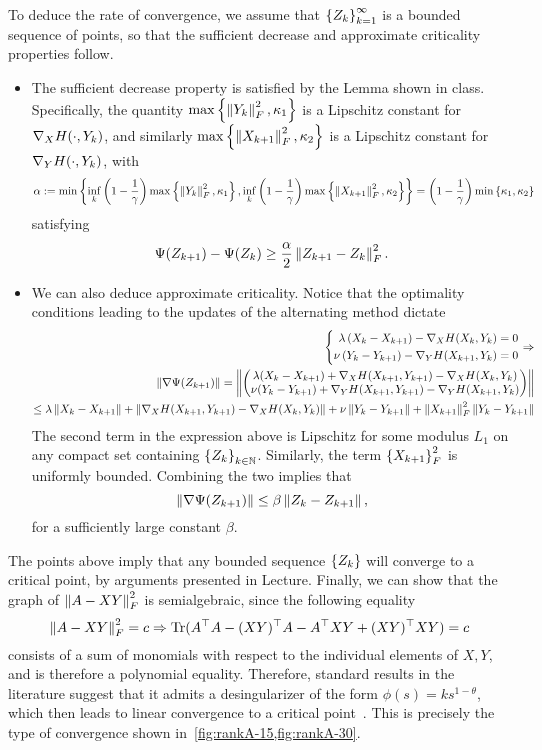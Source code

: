 \documentclass[10pt]{article}
\begin{document}
To deduce the rate of convergence, we assume that $\left\{ Z_k \right\}_{k=1}^{\infty}$ is
a bounded sequence of points, so that the sufficient decrease and approximate
criticality properties follow.
\begin{itemize}
\item The sufficient decrease property is satisfied by the Lemma shown in class.
Specifically, the quantity $\max\left\{ \left \| Y_k \right \|_F^2, \kappa_1 \right\}$ is a
Lipschitz constant for $\nabla_X H(\cdot, Y_k)$, and similarly $
\max\left\{ \left \| X_{k+1} \right \|_F^2, \kappa_2 \right\}$ is a Lipschitz constant for $\nabla_Y
H(\cdot, Y_k)$, with
\[
    \alpha := \min\left\{ \inf_k \left(1 - \frac{1}{\gamma}\right)
        \max\left\{ \left \| Y_k \right \|_F^2, \kappa_1 \right\},
        \inf_k \left(1 - \frac{1}{\gamma}\right)
        \max\left\{ \left \| X_{k+1} \right \|_F^2, \kappa_2 \right\} \right\} =
   \left(1 - \frac{1}{\gamma}\right) \min \left\{ \kappa_1, \kappa_2 \right\}
\]
satisfying
\[
    \Psi(Z_{k+1}) - \Psi(Z_k) \geq \frac{\alpha}{2}
    \left \| Z_{k+1} - Z_k \right \|^2_F.
\]
\item We can also deduce approximate criticality. Notice that the optimality
conditions leading to the updates of the alternating method dictate
\begin{align*}
    \left\{ \begin{aligned}
    \lambda \left(X_k - X_{k+1} \right) - \nabla_X H(X_k, Y_k) &= 0 \\
    \nu \left(Y_k - Y_{k+1} \right) - \nabla_Y H(X_{k+1}, Y_k) &= 0
    \end{aligned} \right. \Rightarrow \\
    \left \| \nabla \Psi(Z_{k+1}) \right \| = \left \| \begin{pmatrix} 
        \lambda (X_k - X_{k+1}) + \nabla_X H(X_{k+1}, Y_{k+1}) - \nabla_X
        H(X_k, Y_k) \\
        \nu (Y_k - Y_{k+1}) + \nabla_Y H(X_{k+1}, Y_{k+1}) - \nabla_Y
        H(X_{k+1}, Y_k) \\
     \end{pmatrix} \right \| \\
    \leq \lambda \left \| X_k - X_{k+1} \right \| + \left \| \nabla_X H(X_{k+1}, Y_{k+1})
    - \nabla_X H(X_k, Y_k) \right \| + \nu \left \| Y_k - Y_{k+1} \right \| + \left \| X_{k+1} \right \|_F^2
    \left \| Y_k - Y_{k+1} \right \|
\end{align*}
The second term in the expression above is Lipschitz for some modulus $L_1$
on any compact set containing $\left\{ Z_k \right\}_{k \in \mathbb{N}}$. Similarly, the term
$\left\{ X_{k+1} \right\}_F^2$ is uniformly bounded. Combining the two implies that
\[
    \left \| \nabla \Psi(Z_{k+1}) \right \| \leq \beta \left \| Z_{k} - Z_{k+1} \right \|,
\]
for a sufficiently large constant $\beta$.
\end{itemize}
The points above imply that any bounded sequence $\left\{ Z_k \right\}$ will converge to
a critical point, by arguments presented in Lecture. Finally, we can show that
the graph of $\left \| A - XY \right \|_F^2$ is semialgebraic, since the following equality
\[
    \left \| A - XY \right \|_F^2 = c \Rightarrow
    \mathrm{Tr}(A^\top A - (XY)^\top A - A^\top XY + (XY)^\top XY) = c
\]
consists of a sum of monomials with respect to the individual elements of $X,
Y$, and is therefore a polynomial equality. Therefore, standard results in the
literature suggest that it admits a desingularizer of the form $\phi(s) = ks^{1
- \theta}$, which then leads to linear convergence to a critical
point~\cite[Theorem 5]{AttBolRedSou10}. This is precisely the type of
convergence shown in~\cref{fig:rankA-15,fig:rankA-30}.



\end{document}
